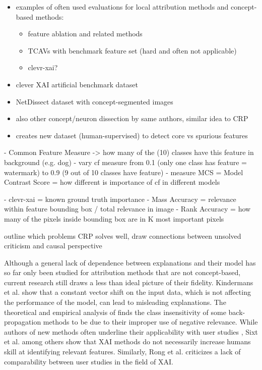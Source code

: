 \begin{itemize}
      \item examples of often used evaluations for local attribution methods and concept-based methods:
            \begin{itemize}
                  \item feature ablation and related methods
                  \item TCAVs \cite{Kim2018} with benchmark feature set (hard and often not applicable)
                  \item clevr-xai? \cite{Arras2022}
            \end{itemize}
      \item clever XAI artificial benchmark dataset \cite{Arras2022}
      \item NetDissect dataset with concept-segmented images \cite{Bau2017}
      \item also other concept/neuron dissection by same authors, similar idea to CRP \cite{Bau2020}
      \item creates new dataset (human-supervised) to detect core vs spurious features \cite{Singla2022}
\end{itemize}

\cite{Yang2019}
- Common Feature Measure -> how many of the (10) classes have this feature in background (e.g. dog)
- vary cf measure from 0.1 (only one class has feature = watermark) to 0.9 (9 out of 10 classes have feature)
- measure MCS = Model Contrast Score = how different is importance of cf in different models

\cite{Arras2022}
- clevr-xai = known ground truth importance
- Mass Accuracy = relevance within feature bounding box / total relevance in image
- Rank Accuracy = how many of the pixels inside bounding box are in K most important pixels


{\color{red} outline which problems CRP solves well, draw connections between unsolved criticism and causal perspective}

Although a general lack of dependence between explanations and their model \cite{Adebayo2018,Karimi2023} has so far only been studied for attribution methods that are not concept-based, current research still draws a less than ideal picture of their fidelity.
Kindermans et al. \cite{Kindermans2019} show that a constant vector shift on the input data, which is not affecting the performance of the model, can lead to misleading explanations. The theoretical and empirical analysis of \cite{Sixt2020} finds the class insensitivity of some back-propagation methods to be due to their improper use of negative relevance.
While authors of new methods often underline their applicability with user studies \cite{Achtibat2023,Fel2023,Ghorbani2019,Zhang2021}, Sixt et al. \cite{Sixt2022a} among others \cite{Singla2022} show that XAI methods do not necessarily increase humans skill at identifying relevant features. Similarly, Rong et al. \cite{Rong2023} criticizes a lack of comparability between user studies in the field of XAI. 

